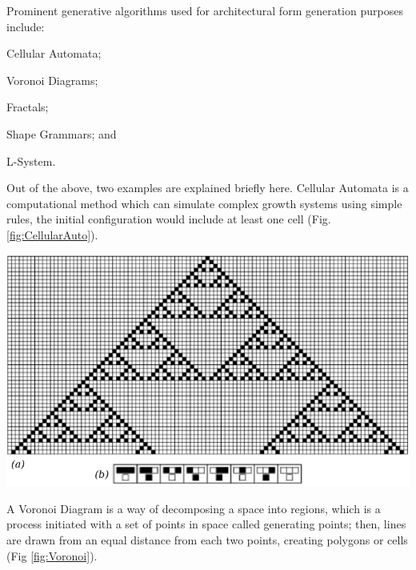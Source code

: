 \documentclass[11pt,a4paper,oneside]{article}
\newenvironment{Figure}		%
	{\par\medskip\noindent\minipage{\linewidth}}
	{\endminipage\par\medskip}
\begin{document}
\begin{multicols}{2}
Prominent generative algorithms used for architectural form generation purposes include:
\begin{compactenum}[\indent 1.]
\item Cellular Automata;
\item Voronoi Diagrams;
\item Fractals;
\item Shape Grammars; and
\item L-System.
\end{compactenum}

Out of the above, two examples are explained briefly here. Cellular Automata is a computational method which can simulate complex growth systems using simple rules, the initial configuration would include at least one cell (Fig. \ref{fig:CellularAuto}).

\begin{Figure}
	\centering	
	\includegraphics[width=\linewidth]{./Images/2-CellularAutomata}
	\label{fig:CellularAuto}
\end{Figure}

A Voronoi Diagram is a way of decomposing a space into regions, which is a process initiated with a set of points in space called generating points; then, lines are drawn from an equal distance from each two points, creating polygons or cells (Fig \ref{fig:Voronoi}).


\end{multicols}
\end{document}
